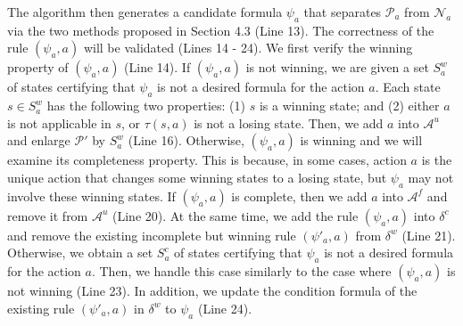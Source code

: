 \documentclass[review]{elsarticle}
\newcommand{\positiveSet}{\mathcal{P}}
\newcommand{\negativeSet}{\mathcal{N}}
\newcommand{\act}{\mathcal{A}}
\newcommand{\suc}{\tau}
\begin{document}
The algorithm then generates a candidate formula $\psi_a$ that separates $\positiveSet_a$ from $\negativeSet_a$ via the two methods proposed in Section 4.3 (Line 13).
The correctness of the rule $(\psi_a, a)$ will be validated (Lines 14 - 24).
We first verify the winning property of $(\psi_a, a)$ (Line 14).
If $(\psi_a, a)$ is not winning, we are given a set $S^w_a$ of states certifying that $\psi_a$ is not a desired formula for the action $a$.
Each state $s \in S^w_a$ has the following two properties:
(1) $s$ is a winning state; and
(2) either $a$ is not applicable in $s$, or $\suc(s, a)$ is not a losing state.
Then, we add $a$ into $\act^u$ and enlarge $\positiveSet'$ by $S^w_a$ (Line 16).
Otherwise, $(\psi_a, a)$ is winning and we will examine its completeness property.
This is because, in some cases, action $a$ is the unique action that changes some winning states to a losing state, but $\psi_a$ may not involve these winning states.
If $(\psi_a, a)$ is complete, then we add $a$ into $\act^f$ and remove it from $\act^u$ (Line 20).
At the same time, we add the rule $(\psi_a, a)$ into $\delta^c$ and remove the existing incomplete but winning rule $(\psi'_a, a)$ from $\delta^w$ (Line 21).
Otherwise, we obtain a set $S^c_a$ of states certifying that $\psi_a$ is not a desired formula for the action $a$.
Then, we handle this case similarly to the case where $(\psi_a, a)$ is not winning (Line 23).
In addition, we update the condition formula of the existing rule $(\psi'_a, a)$ in $\delta^w$ to $\psi_a$ (Line 24).



\end{document}
